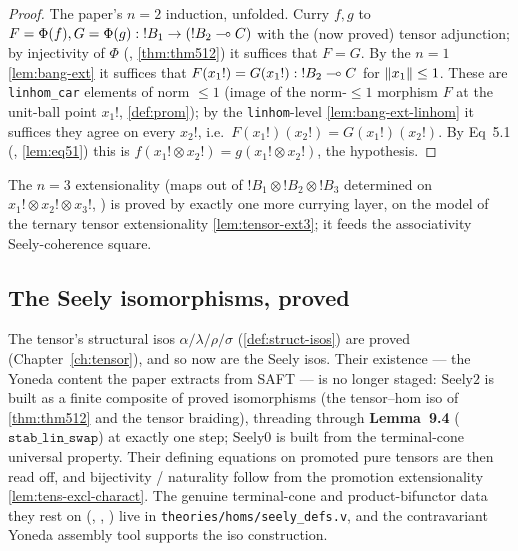 \begin{proof}
The paper's $n = 2$ induction, unfolded. Curry $f, g$ to $F = \Phi(f),
G = \Phi(g) : \mathord{!}B_1 \to (\mathord{!}B_2 \multimap C)$ with the
(now proved) tensor adjunction; by injectivity of $\Phi$
(, \autoref{thm:thm512}) it
suffices that $F = G$. By the $n = 1$ \autoref{lem:bang-ext} it suffices
that $F(x_1!) = G(x_1!) : \mathord{!}B_2 \multimap C$ for $\lVert x_1 \rVert \leq
1$. These are \texttt{linhom\_car} elements of norm $\leq 1$ (image of
the norm-$\leq 1$ morphism $F$ at the unit-ball point $x_1!$,
\autoref{def:prom}); by the \texttt{linhom}-level
\autoref{lem:bang-ext-linhom} it suffices they agree on every $x_2!$,
i.e.\ $F(x_1!)(x_2!) = G(x_1!)(x_2!)$. By Eq~5.1
(, \autoref{lem:eq51}) this is
$f(x_1! \otimes x_2!) = g(x_1! \otimes x_2!)$, the hypothesis.
\end{proof}

\begin{remark}
The $n = 3$ extensionality (maps out of $\mathord{!}B_1 \otimes
\mathord{!}B_2 \otimes \mathord{!}B_3$ determined on $x_1! \otimes x_2!
\otimes x_3!$, \rocqok{}) is
proved by exactly one more currying layer, on the model of the ternary
tensor extensionality \autoref{lem:tensor-ext3}; it feeds the
associativity Seely-coherence square.
\end{remark}

\subsection{The Seely isomorphisms, proved}\label{sec:seely-isos}

The tensor's structural isos $\alpha/\lambda/\rho/\sigma$
(\autoref{def:struct-isos}) are proved (Chapter~\ref{ch:tensor}), and so
now are the Seely isos. Their existence --- the Yoneda content the paper
extracts from SAFT --- is no longer staged: $\mathrm{Seely2}$ is built
as a finite composite of proved isomorphisms (the tensor--hom iso of
\autoref{thm:thm512} and the tensor braiding), threading through
\textbf{Lemma~9.4} ($\texttt{stab\_lin\_swap}$) at exactly one step;
$\mathrm{Seely0}$ is built from the terminal-cone universal property.
Their defining equations on promoted pure tensors are then read off, and
bijectivity / naturality follow from the promotion extensionality
\autoref{lem:tens-excl-charact}. The genuine terminal-cone and
product-bifunctor data they rest on
(, ,
) live in
\texttt{theories/homs/seely\_defs.v}, and the contravariant Yoneda
assembly tool  supports the
iso construction.

